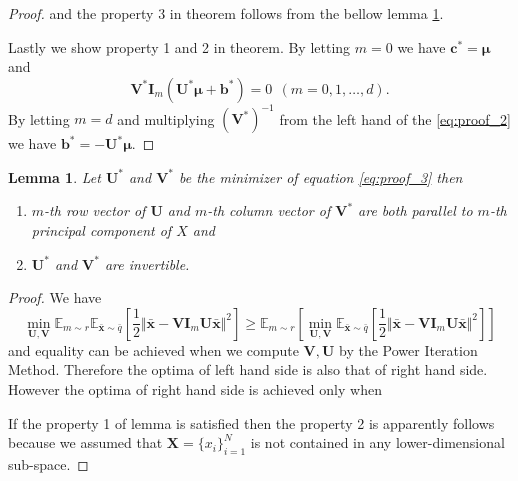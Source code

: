 \documentclass{article}
\newtheorem{lemma}{Lemma}
\begin{document}
\begin{proof}
      and the property 3 in theorem follows from the bellow lemma \ref{lm:svd}. 
      
      Lastly we show property 1 and 2 in theorem. By letting $m=0$ we have $\mathbf{c}^\ast = \mathbf{\mu}$ and 
      \begin{equation}
        \mathbf{V}^\ast \mathbf{I}_m (\mathbf{U^\ast} \mathbf{\mu} + \mathbf{b^\ast}) = 0 \ \ (m=0, 1, \dots, d).
      \end{equation}
      By letting $m=d$ and multiplying $(\mathbf{V}^\ast)^{-1}$ from the left hand of the \ref{eq:proof_2} we have $\mathbf{b}^\ast = - \mathbf{U}^\ast \mathbf{\mu}$.
    \end{proof}

    \begin{lemma}
      \label{lm:svd}
      Let $\mathbf{U}^\ast$ and $\mathbf{V}^\ast$ be the minimizer of equation \ref{eq:proof_3} then 
      \begin{enumerate}
        \item $m$-th row vector of $\mathbf{U}$ and $m$-th column vector of $\mathbf{V}^\ast$ are both parallel to $m$-th principal component of $X$ and
        \item $\mathbf{U}^\ast$ and $\mathbf{V}^\ast$ are invertible.
      \end{enumerate}
    \end{lemma}
    \begin{proof}
      We have
      \begin{equation}
        \min_{\mathbf{U}, \mathbf{V}} \mathbb{E}_{m \sim r} \mathbb{E}_{\bar{\mathbf{x}} \sim \bar{q}} \left[ \frac{1}{2} \Vert \bar{\mathbf{x}} - \mathbf{V} \mathbf{I}_m \mathbf{U} \bar{\mathbf{x}} \Vert^2 \right]  
        \geq \mathbb{E}_{m \sim r} \left[ \min_{\mathbf{U}, \mathbf{V}} \mathbb{E}_{\bar{\mathbf{x}} \sim \bar{q}} \left[ \frac{1}{2} \Vert \bar{\mathbf{x}} - \mathbf{V} \mathbf{I}_m \mathbf{U} \bar{\mathbf{x}} \Vert^2 \right] \right]
        \label{eq:proof_4}
      \end{equation}
      and equality can be achieved when we compute $\mathbf{V}, \mathbf{U}$ by the Power Iteration Method. Therefore the optima of left hand side is also that of right hand side. However the optima of right hand side is achieved only when
      
      If the property 1 of lemma is satisfied then the property 2 is apparently follows because we assumed that $\mathbf{X}=\{x_i\}_{i=1}^N$ is not contained in any lower-dimensional sub-space. 

      
    \end{proof}    
\end{document}
